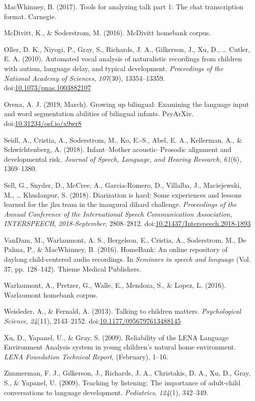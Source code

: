 \documentclass[english,floatsintext,man]{apa6}
\begin{document}
\hypertarget{ref-macwhinney2017tools}{}
MacWhinney, B. (2017). Tools for analyzing talk part 1: The chat
transcription format. Carnegie.

\hypertarget{ref-mcdivitt2016mcdivitt}{}
McDivitt, K., \& Soderstrom, M. (2016). McDivitt homebank corpus.

\hypertarget{ref-Oller}{}
Oller, D. K., Niyogi, P., Gray, S., Richards, J. A., Gilkerson, J., Xu,
D., \ldots{} Cutler, E. A. (2010). Automated vocal analysis of
naturalistic recordings from children with autism, language delay, and
typical development. \emph{Proceedings of the National Academy of
Sciences}, \emph{107}(30), 13354--13359.
doi:\href{https://doi.org/10.1073/pnas.1003882107}{10.1073/pnas.1003882107}

\hypertarget{ref-orena_2019}{}
Orena, A. J. (2019, March). Growing up bilingual: Examining the language
input and word segmentation abilities of bilingual infants. PsyArXiv.
doi:\href{https://doi.org/10.31234/osf.io/x9wr8}{10.31234/osf.io/x9wr8}

\hypertarget{ref-Seidl2018}{}
Seidl, A., Cristia, A., Soderstrom, M., Ko, E.-S., Abel, E. A.,
Kellerman, A., \& Schwichtenberg, A. (2018). Infant--Mother
acoustic--Prosodic alignment and developmental risk. \emph{Journal of
Speech, Language, and Hearing Research}, \emph{61}(6), 1369--1380.

\hypertarget{ref-sell2018}{}
Sell, G., Snyder, D., McCree, A., Garcia-Romero, D., Villalba, J.,
Maciejewski, M., \ldots{} Khudanpur, S. (2018). Diarization is hard:
Some experiences and lessons learned for the jhu team in the inaugural
dihard challenge. \emph{Proceedings of the Annual Conference of the
International Speech Communication Association, INTERSPEECH},
\emph{2018-September}, 2808--2812.
doi:\href{https://doi.org/10.21437/Interspeech.2018-1893}{10.21437/Interspeech.2018-1893}

\hypertarget{ref-vandam2016homebank}{}
VanDam, M., Warlaumont, A. S., Bergelson, E., Cristia, A., Soderstrom,
M., De Palma, P., \& MacWhinney, B. (2016). HomeBank: An online
repository of daylong child-centered audio recordings. In \emph{Seminars
in speech and language} (Vol. 37, pp. 128--142). Thieme Medical
Publishers.

\hypertarget{ref-warlaumont2016warlaumont}{}
Warlaumont, A., Pretzer, G., Walle, E., Mendoza, S., \& Lopez, L.
(2016). Warlaumont homebank corpus.

\hypertarget{ref-Weisleder2013a}{}
Weisleder, A., \& Fernald, A. (2013). Talking to children matters.
\emph{Psychological Science}, \emph{24}(11), 2143--2152.
doi:\href{https://doi.org/10.1177/0956797613488145}{10.1177/0956797613488145}

\hypertarget{ref-Xu2009}{}
Xu, D., Yapanel, U., \& Gray, S. (2009). Reliability of the LENA
Language Environment Analysis system in young children's natural home
environment. \emph{LENA Foundation Technical Report}, (February), 1--16.

\hypertarget{ref-zimmerman2009}{}
Zimmerman, F. J., Gilkerson, J., Richards, J. A., Christakis, D. A., Xu,
D., Gray, S., \& Yapanel, U. (2009). Teaching by listening: The
importance of adult-child conversations to language development.
\emph{Pediatrics}, \emph{124}(1), 342--349.
\end{document}
